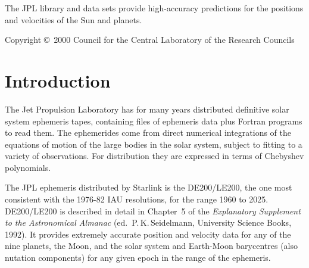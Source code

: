 \documentclass[twoside,11pt]{article}
\newcommand{\stardocinitials}  {SUN}
\newcommand{\stardoccopyright}
{Copyright \copyright\ 2000 Council for the Central Laboratory of the Research Councils}
\newcommand{\stardocnumber}    {87.6}
\newcommand{\stardocabstract}  {
The JPL library and data sets provide high-accuracy predictions for
the positions and velocities of the Sun and planets.}
\newcommand{\stardocname}{\stardocinitials /\stardocnumber}
\newenvironment{latexonly}{}{}
\newcommand{\xlabel}[1]{}
\renewcommand{\_}{\texttt{\symbol{95}}}
\renewcommand{\thepage}{\roman{page}}
\begin{document}
\stardocabstract

\begin{latexonly}
\newpage
\vspace*{\fill}
\stardoccopyright
\end{latexonly}

  \newpage
  \begin{latexonly}
    \setlength{\parskip}{0mm}
    \tableofcontents
    \setlength{\parskip}{\medskipamount}
    \markboth{\stardocname}{\stardocname}
  \end{latexonly}

\cleardoublepage
\renewcommand{\thepage}{\arabic{page}}
\setcounter{page}{1}


\section{\xlabel{introduction}Introduction}
\label{introduction}

The Jet Propulsion Laboratory has for many years distributed definitive
solar system ephemeris tapes, containing files of ephemeris data
plus Fortran programs to read them.  The ephemerides come from direct
numerical integrations of the equations of motion of the large bodies
in the solar system, subject to fitting to a variety of observations.
For distribution they are expressed in terms of Chebyshev polynomials.

The JPL ephemeris distributed by Starlink is the DE200/LE200, the one most
consistent with the 1976-82 IAU resolutions, for the range 1960 to 2025.
DE200/LE200 is described in detail in Chapter~5 of the \textit{Explanatory
Supplement to the Astronomical Almanac}\/ (ed.\ P.\,K.\,Seidelmann,
University Science Books, 1992).  It provides extremely accurate position
and velocity data for any of the nine planets, the Moon, and the solar
system and Earth-Moon barycentres (also nutation components) for any
given epoch in the range of the ephemeris.
\end{document}
